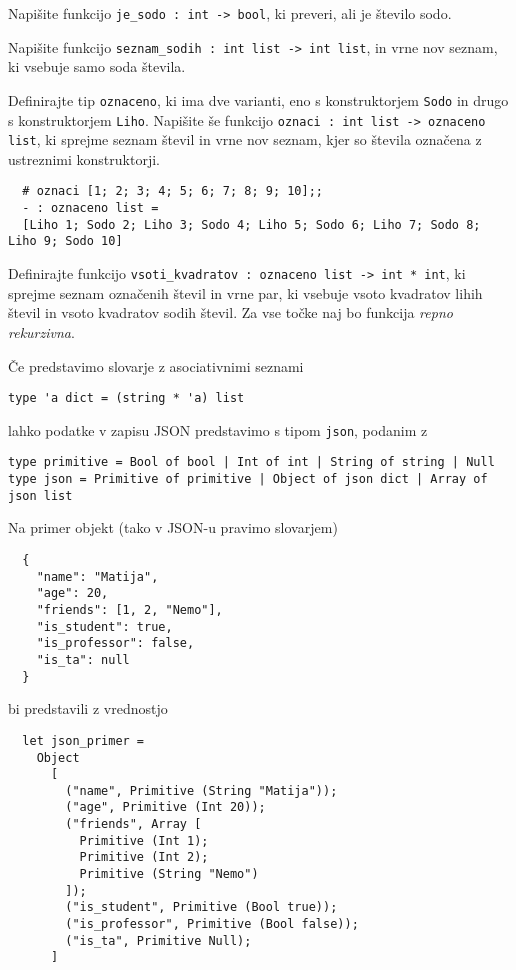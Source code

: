 \documentclass[arhiv]{../izpit}
\begin{document}


\naloga

\podnaloga
Napišite funkcijo \verb|je_sodo : int -> bool|, ki preveri, ali je število sodo.

\podnaloga
Napišite funkcijo \verb|seznam_sodih : int list -> int list|, in vrne nov seznam, ki vsebuje samo soda števila.

\podnaloga
Definirajte tip \verb|oznaceno|, ki ima dve varianti, eno s konstruktorjem \verb|Sodo| in drugo s konstruktorjem \verb|Liho|.
Napišite še funkcijo \verb|oznaci : int list -> oznaceno list|, ki sprejme seznam števil in vrne nov seznam, kjer so števila označena z ustreznimi konstruktorji.

\begin{verbatim}
  # oznaci [1; 2; 3; 4; 5; 6; 7; 8; 9; 10];;
  - : oznaceno list =
  [Liho 1; Sodo 2; Liho 3; Sodo 4; Liho 5; Sodo 6; Liho 7; Sodo 8; Liho 9; Sodo 10]
\end{verbatim}

\podnaloga
Definirajte funkcijo \verb|vsoti_kvadratov : oznaceno list -> int * int|, ki sprejme seznam označenih števil in vrne par, ki vsebuje vsoto kvadratov lihih števil in vsoto kvadratov sodih števil.
Za vse točke naj bo funkcija \emph{repno rekurzivna}.



\naloga

Če predstavimo slovarje z asociativnimi seznami
\begin{verbatim}
type 'a dict = (string * 'a) list
\end{verbatim}
lahko podatke v zapisu JSON predstavimo s tipom \verb|json|, podanim z
\begin{verbatim}
type primitive = Bool of bool | Int of int | String of string | Null
type json = Primitive of primitive | Object of json dict | Array of json list
\end{verbatim}
Na primer objekt (tako v JSON-u pravimo slovarjem)
\begin{verbatim}
  {
    "name": "Matija",
    "age": 20,
    "friends": [1, 2, "Nemo"],
    "is_student": true,
    "is_professor": false,
    "is_ta": null
  }
\end{verbatim}
bi predstavili z vrednostjo
\begin{verbatim}
  let json_primer =
    Object
      [
        ("name", Primitive (String "Matija"));
        ("age", Primitive (Int 20));
        ("friends", Array [ 
          Primitive (Int 1); 
          Primitive (Int 2); 
          Primitive (String "Nemo") 
        ]);
        ("is_student", Primitive (Bool true));
        ("is_professor", Primitive (Bool false));
        ("is_ta", Primitive Null);
      ]
\end{verbatim}
\end{document}
